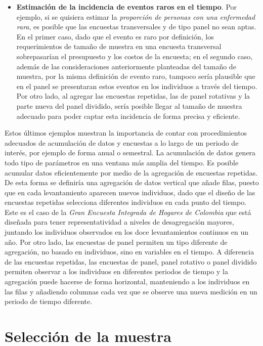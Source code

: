 \begin{itemize}
\item
  \textbf{Estimación de la incidencia de eventos raros en el tiempo}. Por ejemplo, si se quisiera estimar la \emph{proporción de personas con una enfermedad rara}, es posible que las encuestas transversales y de tipo panel no sean aptas. En el primer caso, dado que el evento es raro por definición, los requerimientos de tamaño de muestra en una encuesta transversal sobrepasarían el presupuesto y los costos de la encuesta; en el segundo caso, además de las consideraciones anteriormente planteadas del tamaño de muestra, por la misma definición de evento raro, tampoco sería plausible que en el panel se presentaran estos eventos en los individuos a través del tiempo. Por otro lado, al agregar las encuestas repetidas, las de panel rotativas y la parte nueva del panel dividido, sería posible llegar al tamaño de muestra adecuado para poder captar esta incidencia de forma precisa y eficiente.
\end{itemize}

Estos últimos ejemplos muestran la importancia de contar con procedimientos adecuados de acumulación de datos y encuestas a lo largo de un periodo de interés, por ejemplo de forma anual o semestral. La acumulación de datos genera todo tipo de parámetros en una ventana más amplia del tiempo. Es posible acumular datos eficientemente por medio de la agregación de encuestas repetidas. De esta forma se definiría una agregación de datos vertical que añade filas, puesto que en cada levantamiento aparecen nuevos individuos, dado que el diseño de las encuestas repetidas selecciona diferentes individuos en cada punto del tiempo. Este es el caso de la \emph{Gran Encuesta Integrada de Hogares de Colombia} que está diseñada para tener representatividad a niveles de desagregación mayores, juntando los individuos observados en los doce levantamientos continuos en un año. Por otro lado, las encuestas de panel permiten un tipo diferente de agregación, no basado en individuos, sino en variables en el tiempo. A diferencia de las encuestas repetidas, las encuestas de panel, panel rotativo o panel dividido permiten observar a los individuos en diferentes periodos de tiempo y la agregación puede hacerse de forma horizontal, manteniendo a los individuos en las filas y añadiendo columnas cada vez que se observe una nueva medición en un periodo de tiempo diferente.

\hypertarget{seleccion-de-la-muestra}{%
\chapter{Selección de la muestra}\label{seleccion-de-la-muestra}}

